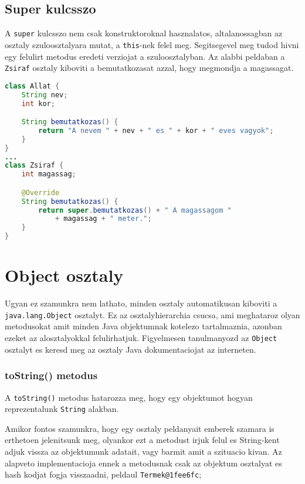 \documentclass{article}
\let\l\lstinline
\begin{document}
\subsection{Super kulcsszo}

A \l{super} kulcsszo nem csak konstruktoroknal hasznalatos, altalanossagban az osztaly szuloosztalyara mutat, a \l{this}-nek felel meg.
Segitsegevel meg tudod hivni egy felulirt metodus eredeti verziojat a szuloosztalyban.
Az alabbi peldaban a \l{Zsiraf} osztaly kiboviti a bemutatkozasat azzal, hogy megmondja a magassagat.

\begin{lstlisting}[language=Java, caption=Override annotacio hasznalata]
class Allat {
    String nev;
    int kor;

    String bemutatkozas() {
        return "A nevem " + nev + " es " + kor + " eves vagyok";
    }
}
...
class Zsiraf {
    int magassag;

    @Override
    String bemutatkozas() {
        return super.bemutatkozas() + " A magassagom "
            + magassag + " meter.";
    }
}
\end{lstlisting}

\section{Object osztaly}

Ugyan ez szamunkra nem lathato, minden osztaly automatikusan kiboviti a \l{java.lang.Object} osztalyt. Ez az osztalyhierarchia csucsa, ami meghataroz olyan metodusokat amit minden Java objektumnak kotelezo tartalmaznia, azonban ezeket az alosztalyokkal felulirhatjuk. Figyelmesen tanulmanyozd az \l{Object} osztalyt es keresd meg az osztaly Java dokumentaciojat az interneten.

\subsubsection{toString() metodus}

A \l{toString()} metodus hatarozza meg, hogy egy objektumot hogyan reprezentalunk \l{String} alakban.

Amikor fontos szamunkra, hogy egy osztaly peldanyait emberek szamara is erthetoen jelenitsunk meg, olyankor ezt a metodust irjuk felul es String-kent adjuk vissza az objektumunk adatait, vagy barmit amit a szituacio kivan.
Az alapveto implementacioja ennek a metodusnak csak az objektum osztalyat es hash kodjat fogja visszaadni, peldaul \l{Termek@1fee6fc};
\end{document}
